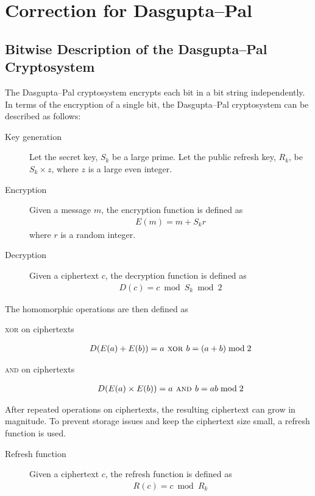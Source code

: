 \section{Correction for Dasgupta--Pal}
\label{chap:correction}
\subsection{Bitwise Description of the Dasgupta--Pal Cryptosystem}
The Dasgupta--Pal cryptosystem \cite{dasgupta_design_2016} encrypts each bit in a bit string independently.
In terms of the encryption of a single bit, the Dasgupta--Pal cryptosystem can be described as follows:
\begin{description}
	\item[Key generation]
	Let the secret key, $S_k$ be a large prime.
	Let the public refresh key, $R_k$, be $S_k \times z$, where $z$ is a large even integer.
	\item[Encryption]
	Given a message $m$, the encryption function is defined as
	\begin{align*}
		E(m) = m + S_kr
	\end{align*}
	where $r$ is a random integer.
	\item[Decryption]
	Given a ciphertext $c$, the decryption function is defined as
	\begin{align*}
		D(c) = c \bmod S_k \bmod 2
	\end{align*}
\end{description}

The homomorphic operations are then defined as
\begin{description}
	\item[\textsc{xor} on ciphertexts]
	\begin{align*}
		D(E(a)+E(b)) = a \textsc{ xor } b = (a + b) \bmod 2
	\end{align*}
	\item[\textsc{and} on ciphertexts]
	\begin{align*}
		D(E(a)\times E(b)) = a \textsc{ and } b = ab \bmod 2
	\end{align*}
\end{description}

After repeated operations on ciphertexts, the resulting ciphertext can grow in magnitude.
To prevent storage issues and keep the ciphertext size small, a refresh function is used.
\begin{description}
	\item[Refresh function]
	Given a ciphertext $c$, the refresh function is defined as
	\begin{align*}
		R(c) = c \bmod R_k
	\end{align*}
\end{description}
